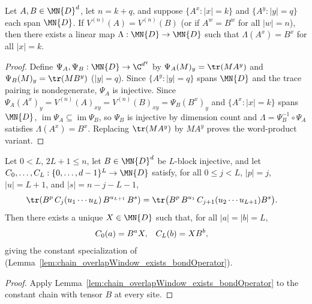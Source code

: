 \begin{lemma}%
    \label{lem:exists_mpvTransport}
    \leanok
    Let $A,B\in\MN{D}^d$, let $n = k + q$, and suppose $\{A^x:|x|=k\}$ and
    $\{A^y:|y|=q\}$ each span $\MN{D}$. If $V^{(n)}(A)=V^{(n)}(B)$ (or if
    $A^w=B^w$ for all $|w|=n$), then there exists a linear map
    $\Lambda:\MN{D}\to\MN{D}$ such that $\Lambda(A^x)=B^x$ for all $|x|=k$.
\end{lemma}
\begin{proof}\leanok
    Define $\Psi_A,\Psi_B:\MN{D}\to\C^{d^q}$ by
    $\Psi_A(M)_y=\tr(M A^y)$ and $\Psi_B(M)_y=\tr(M B^y)$ ($|y|=q$). Since
    $\{A^y:|y|=q\}$ spans $\MN{D}$ and the trace pairing is nondegenerate,
    $\Psi_A$ is injective. Since $\Psi_A(A^x)_y=V^{(n)}(A)_{xy}=V^{(n)}(B)_{xy}=\Psi_B(B^x)_y$
    and $\{A^x:|x|=k\}$ spans $\MN{D}$, $\operatorname{im}\Psi_A\subseteq\operatorname{im}\Psi_B$,
    so $\Psi_B$ is injective by dimension count and $\Lambda=\Psi_B^{-1}\circ\Psi_A$
    satisfies $\Lambda(A^x)=B^x$. Replacing $\tr(M A^y)$ by $M A^y$ proves the
    word-product variant.
\end{proof}

\begin{lemma}%
    \label{lem:overlapWindow_exists_bondOperator}
    \leanok
    Let $0 < L$, $2L + 1 \le n$, let $B\in\MN{D}^d$ be $L$-block injective, and
    let $C_0, \ldots, C_L:\{0,\ldots,d-1\}^L\to\MN{D}$ satisfy, for all
    $0\le j < L$, $|p|=j$, $|u|=L+1$, and $|s|=n-j-L-1$,
    \begin{align}
        \tr(B^{p}\, C_j(u_1 \cdots u_L)\, B^{u_{L+1}}\, B^{s})
         & =
        \tr\bigl(B^{p}\, B^{u_1}\, C_{j+1}(u_2 \cdots u_{L+1})
        B^{s}\bigr).
        \notag
    \end{align}
    Then there exists a unique $X\in\MN{D}$ such that, for all $|a|=|b|=L$,
    \begin{align}
        C_0(a) & = B^a X, &
        C_L(b) & = X B^b,
        \notag
    \end{align}
    giving the constant specialization of \cite[Lemma~5]{Molnar2018NormalPEPS}
    (Lemma~\ref{lem:chain_overlapWindow_exists_bondOperator}).
\end{lemma}
\begin{proof}\leanok
    Apply Lemma~\ref{lem:chain_overlapWindow_exists_bondOperator} to the
    constant chain with tensor $B$ at every site.
\end{proof}

